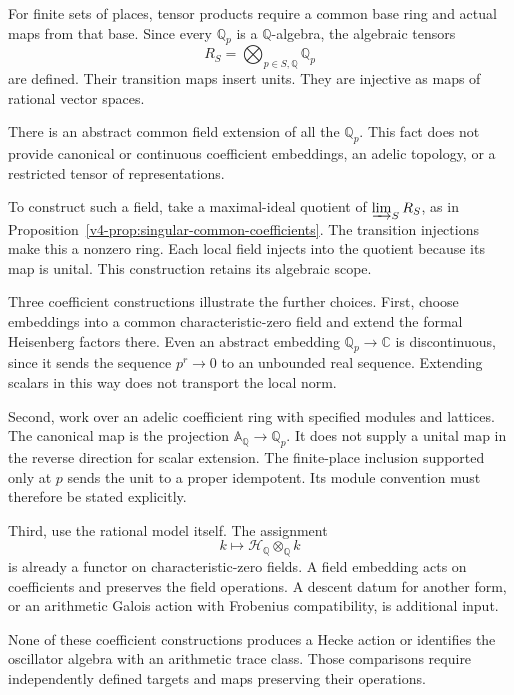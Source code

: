 For finite sets of places, tensor products require a common
base ring and actual maps from that base. Since every
\(\mathbb Q_p\) is a \(\mathbb Q\)-algebra, the algebraic tensors
\[
                         R_S=\bigotimes_{p\in S,\mathbb Q}\mathbb Q_p
\]
are defined. Their transition maps insert units. They are
injective as maps of rational vector spaces.

\begin{observation}\label{v4-arith:obs:no-single-field}
There is an abstract common field extension of all the
\(\mathbb Q_p\). This fact does not provide canonical or
continuous coefficient embeddings, an adelic topology, or a
restricted tensor of representations.
\end{observation}

To construct such a field, take a maximal-ideal quotient of
\(\varinjlim_SR_S\), as in
Proposition~\ref{v4-prop:singular-common-coefficients}.
The transition injections make this a nonzero ring.
Each local field injects into the quotient because its map is
unital. This construction retains its algebraic scope.

Three coefficient constructions illustrate the further choices.
First, choose embeddings into a common characteristic-zero field
and extend the formal Heisenberg factors there. Even an abstract
embedding \(\mathbb Q_p\to\mathbb C\) is discontinuous, since it
sends the sequence \(p^r\to0\) to an unbounded real sequence.
Extending scalars in this way does not transport the local norm.

Second, work over an adelic coefficient ring with specified
modules and lattices. The canonical map is the projection
\(\mathbb A_{\mathbb Q}\to\mathbb Q_p\). It does not supply a
unital map in the reverse direction for scalar extension.
The finite-place inclusion supported only at \(p\) sends the
unit to a proper idempotent. Its module convention must therefore
be stated explicitly.

Third, use the rational model itself. The assignment
\[
                  k\longmapsto\mathcal H_{\mathbb Q}\otimes_{\mathbb Q}k
\]
is already a functor on characteristic-zero fields.
A field embedding acts on coefficients and preserves the field
operations. A descent datum for another form, or an arithmetic
Galois action with Frobenius compatibility, is additional input.

\begin{warning}
None of these coefficient constructions produces a Hecke action
or identifies the oscillator algebra with an arithmetic trace
class. Those comparisons require independently defined targets
and maps preserving their operations.
\end{warning}

